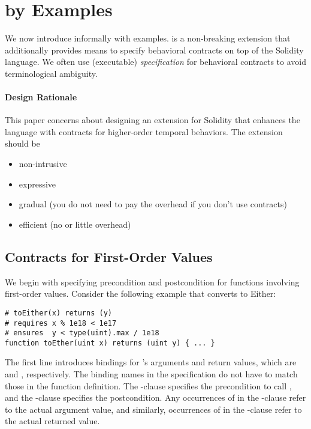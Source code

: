 \section{\lang by Examples}

We now introduce \lang informally with examples.
\lang is a non-breaking extension that additionally provides means
to specify behavioral contracts on top of the Solidity language.
We often use (executable) \emph{specification} for behavioral contracts to avoid terminological ambiguity.

\paragraph{Design Rationale}
This paper concerns about designing an extension for Solidity that enhances the
language with contracts for higher-order temporal behaviors.
The extension should be
\begin{itemize}
  \item non-intrusive
  \item expressive
  \item gradual (you do not need to pay the overhead if you don't use contracts)
  \item efficient (no or little overhead)
\end{itemize}

\subsection{Contracts for First-Order Values}

We begin with specifying precondition and postcondition for functions
involving first-order values. Consider the following  example
that converts  to Either:
\begin{lstlisting}[language=Solidity]
# toEither(x) returns (y)
# requires x % 1e18 < 1e17
# ensures  y < type(uint).max / 1e18
function toEther(uint x) returns (uint y) { ... }
\end{lstlisting}

The first line introduces bindings for 's arguments and return
values, which are  and , respectively.
The binding names in the specification do not have to match those in the function definition.
The -clause specifies the precondition to call ,
and the -clause specifies the postcondition.
Any occurrences of  in the -clause refer to the actual
argument value, and similarly, occurrences of  in the -clause
refer to the actual returned value.

